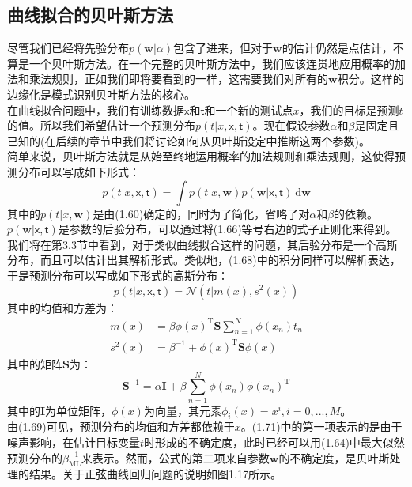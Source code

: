 \documentclass[b5paper]{book}
\numberwithin{equation}{chapter}
\begin{document}
	\subsection{曲线拟合的贝叶斯方法}
	\textnormal{尽管我们已经将先验分布$p(\mathbf{w}|\alpha)$包含了进来，但对于$\mathbf{w}$的估计仍然是点估计，不算是一个贝叶斯方法。在一个完整的贝叶斯方法中，我们应该连贯地应用概率的加法和乘法规则，正如我们即将要看到的一样，这需要我们对所有的$\mathbf{w}$积分。这样的边缘化是模式识别贝叶斯方法的核心。\\
	\indent 在曲线拟合问题中，我们有训练数据$\boldsymbol{\mathsf{x}}$和$\boldsymbol{\mathsf{t}}$和一个新的测试点$x$，我们的目标是预测$t$的值。所以我们希望估计一个预测分布$p(t|x,\boldsymbol{\mathsf{x}},\boldsymbol{\mathsf{t}})$。现在假设参数$\alpha$和$\beta$是固定且已知的(在后续的章节中我们将讨论如何从贝叶斯设定中推断这两个参数)。\\
	\indent 简单来说，贝叶斯方法就是从始至终地运用概率的加法规则和乘法规则，这使得预测分布可以写成如下形式：
	\begin{equation}
		p(t|x,\boldsymbol{\mathsf{x}},\boldsymbol{\mathsf{t}})=\int　p(t|x,\mathbf{w})p(\mathbf{w}|\boldsymbol{\mathsf{x}},\boldsymbol{\mathsf{t}})\ \mathrm{d}\mathbf{w}
	\end{equation}
	\indent 其中的$p(t|x,\mathbf{w})$是由(1.60)确定的，同时为了简化，省略了对$\alpha$和$\beta$的依赖。$p(\mathbf{w}|\boldsymbol{\mathsf{x}},\boldsymbol{\mathsf{t}})$是参数的后验分布，可以通过将(1.66)等号右边的式子正则化来得到。我们将在第3.3节中看到，对于类似曲线拟合这样的问题，其后验分布是一个高斯分布，而且可以估计出其解析形式。类似地，(1.68)中的积分同样可以解析表达，于是预测分布可以写成如下形式的高斯分布：
	\begin{equation}
		p(t|x,\boldsymbol{\mathsf{x}},\boldsymbol{\mathsf{t}})=\mathcal{N}(t|m(x),s^2(x))
	\end{equation}
	\indent 其中的均值和方差为：
	\begin{align}
		m(x)&=\beta \phi(x)^\mathrm{T}\mathbf{S}\sum_{n=1}^{N}\phi(x_n)t_n \\
		s^2(x) &= \beta^{-1} + \phi(x)^\mathrm{T}\mathbf{S}\phi(x)
	\end{align}
	\indent 其中的矩阵$\mathbf{S}$为：
	\begin{equation}
		\mathbf{S}^{-1}=\alpha\mathbf{I}+\beta\sum_{n=1}^{N}\phi(x_n)\phi(x_n)^\mathrm{T}
	\end{equation}
	\indent 其中的$\mathbf{I}$为单位矩阵，$\phi(x)$为向量，其元素$\phi_i(x)=x^i,i=0,...,M$。\\
	\indent 由(1.69)可见，预测分布的均值和方差都依赖于$x$。(1.71)中的第一项表示的是由于噪声影响，在估计目标变量$t$时形成的不确定度，此时已经可以用(1.64)中最大似然预测分布的$\beta_{\mathrm{ML}}^{-1}$来表示。然而，公式的第二项来自参数$\mathbf{w}$的不确定度，是贝叶斯处理的结果。关于正弦曲线回归问题的说明如图1.17所示。
}
\end{document}
